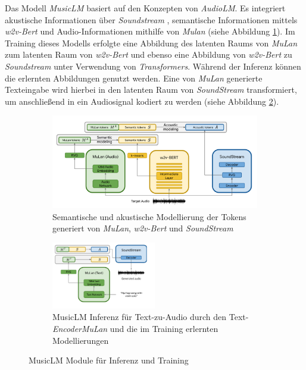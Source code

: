 \documentclass[
  a4paper,  %
  twoside,  %
  bibliography=totoc,
  headsepline,
  cleardoublepage=empty,
  parskip=half,
  draft=false
]{scrbook}
\begin{document}
Das Modell \emph{MusicLM} \cite{agostinelli_musiclm_2023} basiert auf den Konzepten von \emph{AudioLM}. Es integriert akustische Informationen über \emph{Soundstream} \cite{zeghidour_soundstream_2021}, semantische Informationen mittels \emph{w2v-Bert} \cite{chung_w2v-bert_2021-1} und Audio-Informationen mithilfe von \emph{Mulan} \cite{huang_mulan_2022} (siehe Abbildung \ref{fig:MusicLM_tokens}). Im Training dieses Modells erfolgte eine Abbildung des latenten Raums von \emph{MuLan} zum latenten Raum von \emph{w2v-Bert} und ebenso eine Abbildung von \emph{w2v-Bert} zu \emph{Soundstream} unter Verwendung von \emph{Transformers}. Während der Inferenz können die erlernten Abbildungen genutzt werden. Eine von \emph{MuLan} generierte Texteingabe wird hierbei in den latenten Raum von \emph{SoundStream} transformiert, um anschließend in ein Audiosignal kodiert zu werden (siehe Abbildung \ref{fig:MusicLM_Inference}). \cite{agostinelli_musiclm_2023}

\begin{figure}[h]
\centering
\begin{subfigure}{.8\textwidth}
  \centering
  \includegraphics[width=1\textwidth]{graphics/MusicLM1.png}
  \caption[MusicLM Tokenisierung]{Semantische und akustische Modellierung der Tokens generiert von \emph{MuLan}, \emph{w2v-Bert} und \emph{SoundStream}  \cite{agostinelli_musiclm_2023}}
  \label{fig:MusicLM_tokens}
\end{subfigure}

\vspace{1em} %

\begin{subfigure}{1.0\textwidth}
  \centering
  \includegraphics[width=0.5\textwidth]{graphics/MusicLM2.png}
  \caption[MusicLM Inferenz]{MusicLM Inferenz für Text-zu-Audio durch den Text-\emph{Encoder}\emph{MuLan} und die im Training erlernten Modellierungen \cite{agostinelli_musiclm_2023}}
  \label{fig:MusicLM_Inference}
\end{subfigure}
\caption[MusicLM Module]{MusicLM Module für Inferenz und Training \cite{agostinelli_musiclm_2023}}
\label{fig:test}
\end{figure}
\end{document}
